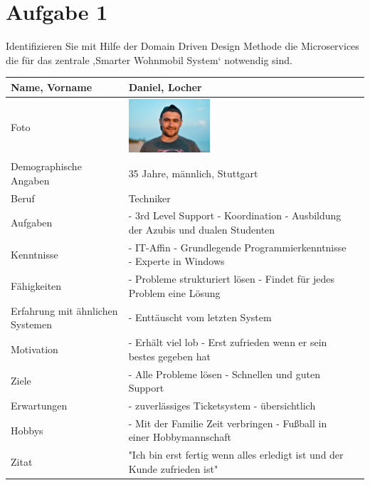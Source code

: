 \chapter{Aufgabe 1}
Identifizieren Sie mit Hilfe der Domain Driven Design Methode die Microservices die für das zentrale ‚Smarter Wohnmobil System‘ notwendig sind.

\begin{tabularx}{\textwidth}{|X|X|X|}
        \hline
        Name, Vorname   &  Daniel, Locher   \\
        \hline
        Foto   &  \includegraphics[height=2cm]{images/Persona_Bild.jpg}  \\
        \hline
        Demographische Angaben & 35 Jahre, männlich, Stuttgart \\
        \hline
        Beruf & Techniker \\
        \hline
        Aufgaben & - 3rd Level Support \newline - Koordination \newline - Ausbildung der Azubis und dualen Studenten \\
        \hline
        Kenntnisse & - IT-Affin \newline - Grundlegende Programmierkenntnisse \newline - Experte in Windows \\
        \hline
        Fähigkeiten & - Probleme strukturiert lösen \newline - Findet für jedes Problem eine Lösung \\
        \hline
        Erfahrung mit ähnlichen Systemen & - Enttäuscht vom letzten System \newline \\
        \hline
        Motivation & - Erhält viel lob \newline - Erst zufrieden wenn er sein bestes gegeben hat \\
        \hline
        Ziele & - Alle Probleme lösen \newline - Schnellen und guten Support \\
        \hline
        Erwartungen & - zuverlässiges Ticketsystem \newline - übersichtlich \\
        \hline
        Hobbys & - Mit der Familie Zeit verbringen \newline - Fußball in einer Hobbymannschaft\\
        \hline
        Zitat & "Ich bin erst fertig wenn alles erledigt ist und der Kunde zufrieden ist" \\
        \hline
        
    \end{tabularx}